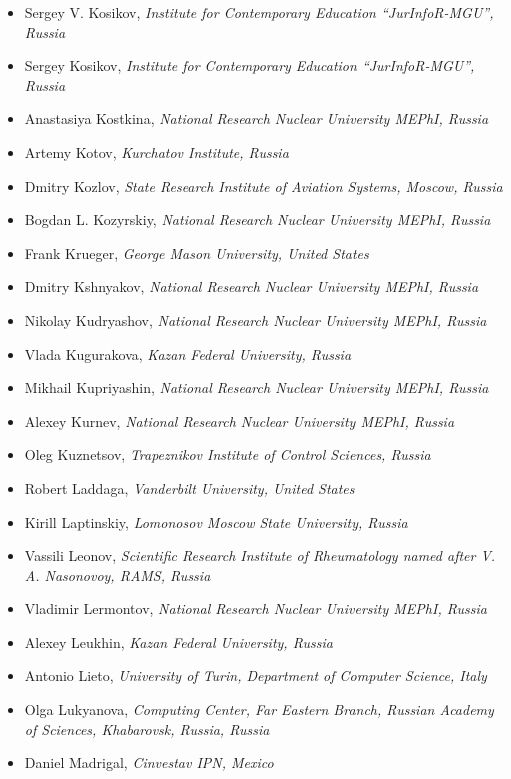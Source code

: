 \documentclass[10pt,fleqn,openany]{book} %
\begin{document}
\begin{itemize}
		\item Sergey V. Kosikov, \textit{Institute for Contemporary Education ``JurInfoR-MGU'', Russia}
		\item Sergey Kosikov, \textit{Institute for Contemporary Education ``JurInfoR-MGU'', Russia}
		\item Anastasiya Kostkina, \textit{National Research Nuclear University MEPhI, Russia}
		\item Artemy Kotov, \textit{Kurchatov Institute, Russia}
		\item Dmitry Kozlov, \textit{State Research Institute of Aviation Systems, Moscow, Russia}
		\item Bogdan L. Kozyrskiy, \textit{National Research Nuclear University MEPhI, Russia}
		\item Frank Krueger, \textit{George Mason University, United States}
		\item Dmitry Kshnyakov, \textit{National Research Nuclear University MEPhI, Russia}
		\item Nikolay Kudryashov, \textit{National Research Nuclear University MEPhI, Russia}
		\item Vlada Kugurakova, \textit{Kazan Federal University, Russia}
		\item Mikhail Kupriyashin, \textit{National Research Nuclear University MEPhI, Russia}
		\item Alexey Kurnev, \textit{National Research Nuclear University MEPhI, Russia}
		\item Oleg Kuznetsov, \textit{Trapeznikov Institute of Control Sciences, Russia}
		\item Robert Laddaga, \textit{Vanderbilt University, United States}
		\item Kirill Laptinskiy, \textit{Lomonosov Moscow State University, Russia}
		\item Vassili Leonov, \textit{Scientific Research Institute of Rheumatology named after V. A. Nasonovoy, RAMS, Russia}
		\item Vladimir Lermontov, \textit{National Research Nuclear University MEPhI, Russia}
		\item Alexey Leukhin, \textit{Kazan Federal University, Russia}
		\item Antonio Lieto, \textit{University of Turin, Department of Computer Science, Italy}
		\item Olga Lukyanova, \textit{Computing Center, Far Eastern Branch, Russian Academy of Sciences, Khabarovsk, Russia, Russia}
		\item Daniel Madrigal, \textit{Cinvestav IPN, Mexico}

\end{itemize}
\end{document}
